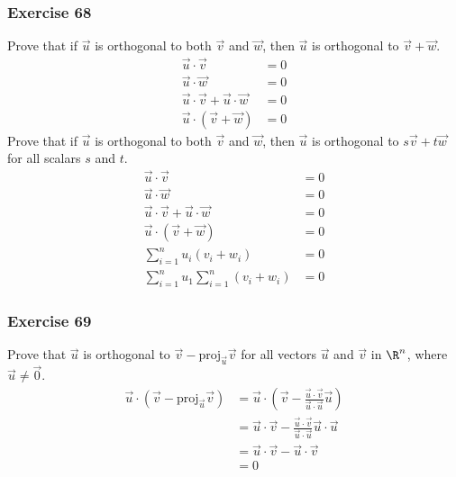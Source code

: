 \documentclass{math}
\begin{document}
\subsubsection*{Exercise 68}
Prove that if \( \vec{u} \) is orthogonal to both \( \vec{v} \) and \( \vec{w}
\), then \( \vec{u} \) is orthogonal to \( \vec{v}+\vec{w} \).
\begin{align*}
  \vec{u}\cdot\vec{v} &= 0 \\
  \vec{u}\cdot\vec{w} &= 0 \\
  \vec{u}\cdot\vec{v}+\vec{u}\cdot\vec{w} &= 0 \\
  \vec{u}\cdot(\vec{v}+\vec{w}) &= 0
\end{align*}
Prove that if \( \vec{u} \) is orthogonal to both \( \vec{v} \) and \( \vec{w}
\), then \( \vec{u} \) is orthogonal to \( s\vec{v}+t\vec{w} \) for all
scalars \( s \) and \( t \).
\begin{align*}
  \vec{u}\cdot\vec{v} &= 0 \\
  \vec{u}\cdot\vec{w} &= 0 \\
  \vec{u}\cdot\vec{v}+\vec{u}\cdot\vec{w} &= 0 \\
  \vec{u}\cdot(\vec{v}+\vec{w}) &= 0 \\
  \sum_{i=1}^{n}u_i(v_i+w_i) &= 0 \\
  \sum_{i=1}^{n}u_1\sum_{i=1}^{n}(v_i+w_i) &= 0
\end{align*}

\subsubsection*{Exercise 69}
Prove that \( \vec{u} \) is orthogonal to
\( \vec{v}-\text{proj}_{\vec{u}}\vec{v} \)
for all vectors \( \vec{u} \) and \( \vec{v} \) in \( \R^n \), where
\( \vec{u}\ne\vec{0} \).
\begin{align*}
  \vec{u}\cdot(\vec{v}-\text{proj}_{\vec{u}}\vec{v}) &= \vec{u}\cdot(\vec{v}-
    \frac{\vec{u}\cdot\vec{v}}{\vec{u}\cdot\vec{u}}\vec{u}) \\
  &= \vec{u}\cdot\vec{v}-
    \frac{\vec{u}\cdot\vec{v}}{\vec{u}\cdot\vec{u}}\vec{u}\cdot\vec{u} \\
  &= \vec{u}\cdot\vec{v}-\vec{u}\cdot\vec{v} \\
  &= 0
\end{align*}
\end{document}

